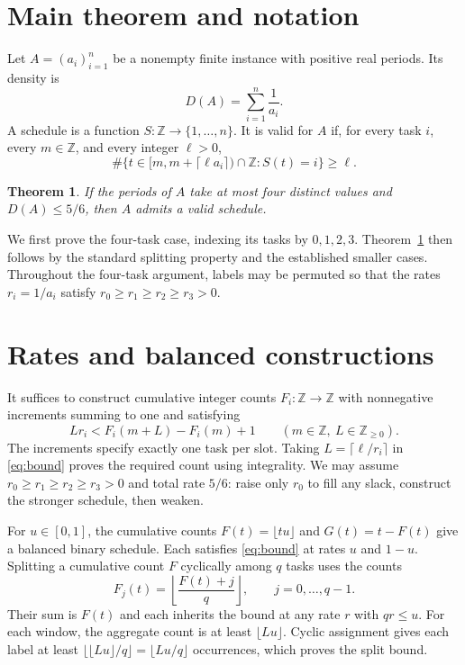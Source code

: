 \documentclass[11pt]{article}
\newtheorem{theorem}{Theorem}\newtheorem{lemma}[theorem]{Lemma}\newtheorem{corollary}[theorem]{Corollary}
\begin{document}
\section{Main theorem and notation}
Let $A=(a_i)_{i=1}^n$ be a nonempty finite instance with positive real periods. Its density is
\[
D(A)=\sum_{i=1}^n\frac1{a_i}.
\]
A schedule is a function $S:\mathbb Z\to\{1,\ldots,n\}$. It is valid for $A$ if, for every task $i$, every $m\in\mathbb Z$, and every integer $\ell>0$,
\[
\#\{t\in[m,m+\lceil\ell a_i\rceil)\cap\mathbb Z:S(t)=i\}\geq\ell.
\]
\begin{theorem}\label{thm:main}
If the periods of $A$ take at most four distinct values and $D(A)\leq5/6$, then $A$ admits a valid schedule.
\end{theorem}

We first prove the four-task case, indexing its tasks by $0,1,2,3$. Theorem~\ref{thm:main} then follows by the standard splitting property and the established smaller cases. Throughout the four-task argument, labels may be permuted so that the rates $r_i=1/a_i$ satisfy $r_0\geq r_1\geq r_2\geq r_3>0$.

\section{Rates and balanced constructions}
It suffices to construct cumulative integer counts $F_i:\mathbb Z\to\mathbb Z$ with nonnegative increments summing to one and satisfying
\begin{equation}\label{eq:bound}
Lr_i<F_i(m+L)-F_i(m)+1\qquad(m\in\mathbb Z,\ L\in\mathbb Z_{\geq0}).
\end{equation}
The increments specify exactly one task per slot. Taking $L=\lceil\ell/r_i\rceil$ in \eqref{eq:bound} proves the required count using integrality. We may assume $r_0\geq r_1\geq r_2\geq r_3>0$ and total rate $5/6$: raise only $r_0$ to fill any slack, construct the stronger schedule, then weaken.

For $u\in[0,1]$, the cumulative counts $F(t)=\lfloor tu\rfloor$ and $G(t)=t-F(t)$ give a balanced binary schedule. Each satisfies \eqref{eq:bound} at rates $u$ and $1-u$. Splitting a cumulative count $F$ cyclically among $q$ tasks uses the counts
\[
F_j(t)=\left\lfloor\frac{F(t)+j}{q}\right\rfloor,\qquad j=0,\ldots,q-1.
\]
Their sum is $F(t)$ and each inherits the bound at any rate $r$ with $qr\leq u$. For each window, the aggregate count is at least $\lfloor Lu\rfloor$. Cyclic assignment gives each label at least $\lfloor\lfloor Lu\rfloor/q\rfloor=\lfloor Lu/q\rfloor$ occurrences, which proves the split bound.
\end{document}
